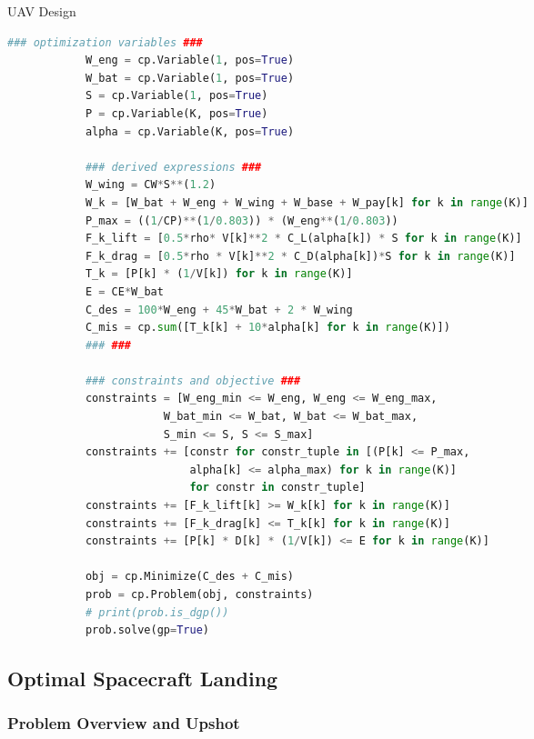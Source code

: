 \documentclass[12pt,reqno]{article}
\theoremstyle{definition}
\numberwithin{equation}{section}
\begin{document}
    \begin{algorithm}[H]
        \caption{UAV Design}
        \centering
            \begin{lstlisting}[language=Python]
            ### optimization variables ###
            W_eng = cp.Variable(1, pos=True)
            W_bat = cp.Variable(1, pos=True)
            S = cp.Variable(1, pos=True)
            P = cp.Variable(K, pos=True)
            alpha = cp.Variable(K, pos=True)
            
            ### derived expressions ###
            W_wing = CW*S**(1.2)
            W_k = [W_bat + W_eng + W_wing + W_base + W_pay[k] for k in range(K)]
            P_max = ((1/CP)**(1/0.803)) * (W_eng**(1/0.803))
            F_k_lift = [0.5*rho* V[k]**2 * C_L(alpha[k]) * S for k in range(K)]
            F_k_drag = [0.5*rho * V[k]**2 * C_D(alpha[k])*S for k in range(K)]
            T_k = [P[k] * (1/V[k]) for k in range(K)]
            E = CE*W_bat
            C_des = 100*W_eng + 45*W_bat + 2 * W_wing
            C_mis = cp.sum([T_k[k] + 10*alpha[k] for k in range(K)])
            ### ###
            
            ### constraints and objective ###
            constraints = [W_eng_min <= W_eng, W_eng <= W_eng_max,
                        W_bat_min <= W_bat, W_bat <= W_bat_max,
                        S_min <= S, S <= S_max]
            constraints += [constr for constr_tuple in [(P[k] <= P_max,
                            alpha[k] <= alpha_max) for k in range(K)]
                            for constr in constr_tuple]
            constraints += [F_k_lift[k] >= W_k[k] for k in range(K)]
            constraints += [F_k_drag[k] <= T_k[k] for k in range(K)]
            constraints += [P[k] * D[k] * (1/V[k]) <= E for k in range(K)]
            
            obj = cp.Minimize(C_des + C_mis)
            prob = cp.Problem(obj, constraints)
            # print(prob.is_dgp())
            prob.solve(gp=True)
            \end{lstlisting}
        \label{alg:uav_code}
    \end{algorithm}

\subsection{Optimal Spacecraft Landing}

\subsubsection*{Problem Overview and Upshot}
\end{document}

